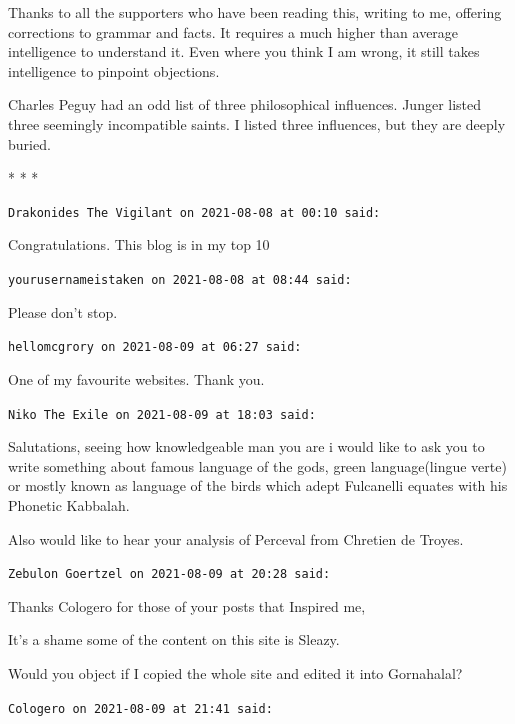 Thanks to all the supporters who have been reading this, writing to me, offering corrections to grammar and facts. It requires a much higher than average intelligence to understand it. Even where you think I am wrong, it still takes intelligence to pinpoint objections.

Charles Peguy had an odd list of three philosophical influences. Junger listed three seemingly incompatible saints. I listed three influences, but they are deeply buried.




\begin{center}* * *\end{center}

\begin{footnotesize}
\begin{sffamily}
\texttt{Drakonides The Vigilant on 2021-08-08 at 00:10 said:}

Congratulations. This blog is in my top 10

\hfill

\texttt{yourusernameistaken on 2021-08-08 at 08:44 said:}

Please don't stop.

\hfill

\texttt{hellomcgrory on 2021-08-09 at 06:27 said:}

One of my favourite websites. Thank you.

\hfill

\texttt{Niko The Exile on 2021-08-09 at 18:03 said:}

Salutations, seeing how knowledgeable man you are i would like to ask you to write something about famous language of the gods, green language(lingue verte) or mostly known as language of the birds which adept Fulcanelli equates with his Phonetic Kabbalah.

Also would like to hear your analysis of Perceval from Chretien de Troyes.

\hfill

\texttt{Zebulon Goertzel on 2021-08-09 at 20:28 said:}

Thanks Cologero for those of your posts that Inspired me,

It's a shame some of the content on this site is Sleazy.

Would you object if I copied the whole site and edited it into Gornahalal?

\hfill

\texttt{Cologero on 2021-08-09 at 21:41 said:}


\end{sffamily}
\end{footnotesize}
